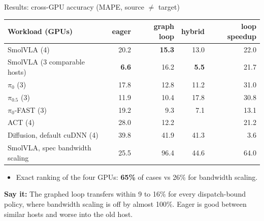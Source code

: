 \documentclass[aspectratio=169,10pt]{beamer}
\newcommand{\say}[1]{\par\vfill\noindent\colorbox{soft}{\parbox{\dimexpr\textwidth-2\fboxsep\relax}{\small\textbf{\textcolor{accent}{Say it:}} #1}}}
\begin{document}
\begin{frame}{Results: cross-GPU accuracy (MAPE, source $\neq$ target)}
\centering\small
\begin{tabular}{lrrrr}\toprule
Workload (GPUs) & eager & graph loop & hybrid & loop speedup\\\midrule
SmolVLA (4) & 20.2 & \textbf{15.3} & 13.0 & 22.0\\
SmolVLA (3 comparable hosts) & \textbf{6.6} & 16.2 & \textbf{5.5} & 21.7\\
$\pi_0$ (3) & 17.8 & 12.8 & 11.2 & 31.0\\
$\pi_{0.5}$ (3) & 11.9 & 10.4 & 17.8 & 30.8\\
$\pi_0$-FAST (3) & 19.2 & 9.3 & 7.1 & 13.1\\
ACT (4) & 28.0 & 12.2 & & 21.2\\
Diffusion, default cuDNN (4) & 39.8 & 41.9 & 41.3 & 3.6\\\midrule
SmolVLA, spec bandwidth scaling & 25.5 & \alert{96.4} & 44.6 & 64.0\\\bottomrule
\end{tabular}
\vspace{0.5em}
\begin{itemize}\small
\item Exact ranking of the four GPUs: \textbf{65\%} of cases vs 26\% for bandwidth scaling.
\end{itemize}
\say{The graphed loop transfers within 9 to 16\% for every dispatch-bound policy, where
bandwidth scaling is off by almost 100\%. Eager is good between similar hosts and worse into
the old host.}
\end{frame}
\end{document}
